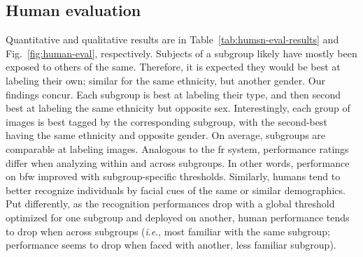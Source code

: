 \documentclass[10pt,twocolumn,letterpaper]{article}
\newcommand{\ie}{\textit{i}.\textit{e}., }
\begin{document}
\subsection{Human evaluation}
 Quantitative and qualitative results are in Table~\ref{tab:humsn-eval-results} and Fig.~\ref{fig:human-eval}, respectively. Subjects of a subgroup likely have mostly been exposed to others of the same. Therefore, it is expected they would be best at labeling their own; similar for the same ethnicity, but another gender. Our findings concur. Each subgroup is best at labeling their type, and then second best at labeling the same ethnicity but opposite sex. Interestingly, each group of images is best tagged by the corresponding subgroup, with the second-best having the same ethnicity and opposite gender. On average, subgroups are comparable at labeling images. Analogous to the \gls{fr} system, performance ratings differ when analyzing within and across subgroups. In other words, performance on \gls{bfw} improved with subgroup-specific thresholds. Similarly, humans tend to better recognize individuals by facial cues of the same or similar demographics. Put differently, as the recognition performances drop with a global threshold optimized for one subgroup and deployed on another, human performance tends to drop when across subgroups (\ie most familiar with the same subgroup; performance seems to drop when faced with another, less familiar subgroup).
 
\end{document}

